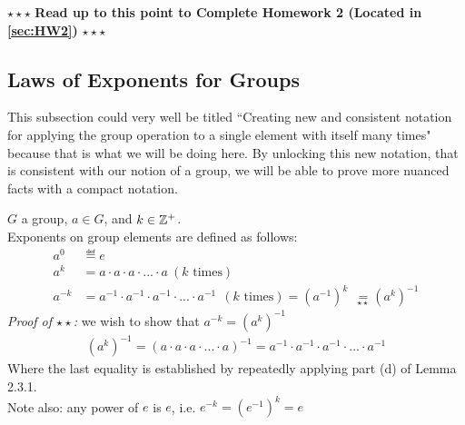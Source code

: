 \begin{tcolorbox}
\begin{center}
    $\star\star\star$ \textbf{Read up to this point to Complete Homework 2 (Located in \ref{sec:HW2})} $\star\star\star$
\end{center}
\end{tcolorbox}
\newpage
\subsection{Laws of Exponents for Groups } This subsection could very well be titled ``Creating new and consistent notation for applying the group operation to a single element with itself many times" because that is what we will be doing here. By unlocking this new notation, that is consistent with our notion of a group, we will be able to prove more nuanced facts with a compact notation.\steezybreak
\begin{definition}
\noindent $G$ a group, $a\in G$, and $k\in {\mathbb{ Z}}^+$. \\
Exponents on group elements are defined as follows:
\begin{align}
    a^{0} & \eqdef e \nonumber \\
    a^{k} &= a\cdot a\cdot a \cdot ... \cdot a \ (  k \text{ times} )\nonumber \\
    a^{-k} &= a^{-1}\cdot a^{-1} \cdot a^{-1} \cdot ... \cdot a^{-1} \ \ ( k \text{ times}) = (a^{-1})^k\ \  \underset{\star\star}{=} (a^{k})^{-1} \nonumber
\end{align}
\textit{Proof of $\star\star$:} we wish to show that $a^{-k}=(a^{k})^{-1}$ 
\begin{align}
    (a^k)^{-1}=(a\cdot a\cdot a \cdot ... \cdot a)^{-1} = a^{-1}\cdot a^{-1}\cdot a^{-1} \cdot ... \cdot a^{-1}\nonumber 
\end{align}
Where the last equality is established by repeatedly applying part (d) of Lemma 2.3.1. \steezybreak\\
Note also: any power of $e$ is $e$, i.e. $e^{-k}=(e^{-1})^k=e$
\end{definition}

